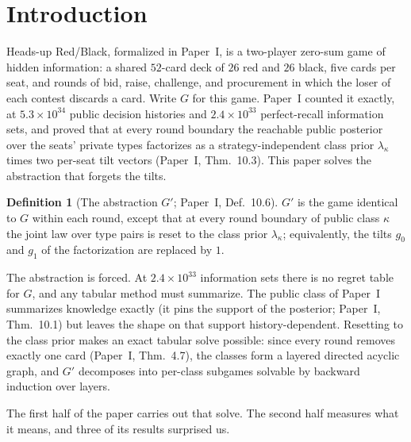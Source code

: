 \documentclass[11pt]{article}
\theoremstyle{plain}
\theoremstyle{definition}
\newtheorem{definition}[theorem]{Definition}
\theoremstyle{remark}
\newcommand{\game}{\ensuremath{G}}
\newcommand{\gp}{\ensuremath{G'}}
\begin{document}
\section{Introduction}\label{sec:intro}

Heads-up Red/Black, formalized in Paper~I, is a two-player zero-sum game of
hidden information: a shared $52$-card deck of $26$ red and $26$ black, five
cards per seat, and rounds of bid, raise, challenge, and procurement in which
the loser of each contest discards a card. Write $\game$ for this game. Paper~I
counted it exactly, at $5.3\times10^{34}$ public decision histories and
$2.4\times10^{33}$ perfect-recall information sets, and proved that at every
round boundary the reachable public posterior over the seats' private types
factorizes as a strategy-independent class prior $\lambda_\kappa$ times two
per-seat tilt vectors (Paper~I, Thm.~10.3). This paper solves the abstraction
that forgets the tilts.

\begin{definition}[The abstraction $\gp$; Paper~I, Def.~10.6]
\label{def:gprime}
$\gp$ is the game identical to $\game$ within each round, except that at
every round boundary of public class $\kappa$ the joint law over type
pairs is reset to the class prior $\lambda_\kappa$; equivalently, the
tilts $g_0$ and $g_1$ of the factorization are replaced by $1$.
\end{definition}

The abstraction is forced. At $2.4\times10^{33}$ information sets there is no
regret table for $\game$, and any tabular method must summarize. The public
class of Paper~I summarizes knowledge exactly (it pins the support of the
posterior; Paper~I, Thm.~10.1) but leaves the shape on that support
history-dependent. Resetting to the class prior makes an exact tabular solve
possible: since every round removes exactly one card (Paper~I, Thm.~4.7), the
classes form a layered directed acyclic graph, and $\gp$ decomposes into
per-class subgames solvable by backward induction over layers.

The first half of the paper carries out that solve. The second half measures
what it means, and three of its results surprised us.
\end{document}
